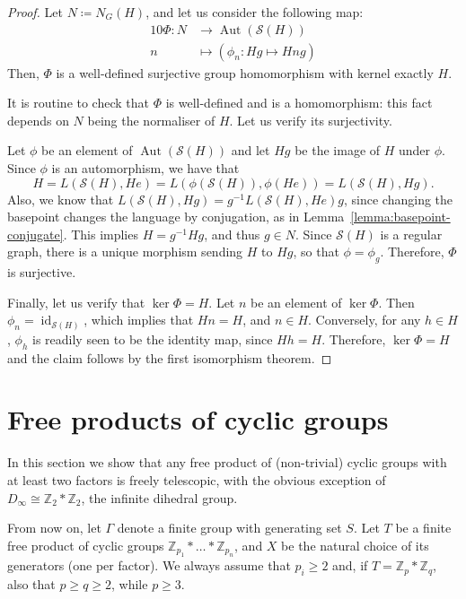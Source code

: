 \documentclass[ALCO,ThmDefs,Unicode,epreuves]{cedram}
\newcommand{\ZZ}{\mathbb{Z}}
\newcommand{\cS}{\mathcal{S}}
\DeclareMathOperator{\aut}{Aut}
\DeclareMathOperator{\id}{id}
\begin{document}
\begin{proof}
Let $N \coloneqq N_G(H)$, and let us consider the following map:
\begin{alignat*}{10}
\Phi : N &\longrightarrow \aut(\cS(H))\\
n &\longmapsto \left( \phi_n : Hg \mapsto Hng \right)
\end{alignat*}
Then, $\Phi$ is a well-defined surjective group homomorphism with kernel exactly $H$. 

It is routine to check that $\Phi$ is well-defined and is a homomorphism: this fact depends on $N$ being the normaliser of $H$. Let us verify its surjectivity. 

Let $\phi$ be an element of $\aut(\cS(H))$ and let $Hg$ be the image of $H$ under $\phi$.
Since ${\phi}$ is an automorphism, we have that
\[
 H = L(\cS(H),He) = L({\phi}(\cS(H)),{\phi}(He)) = L(\cS(H),Hg).
\]
Also, we know that $L(\cS(H),Hg) = g^{-1}L(\cS(H),He)g$, since changing the basepoint changes the language by conjugation, as in Lemma~\ref{lemma:basepoint-conjugate}. This implies $H = g^{-1}Hg$, and thus $g\in N$. Since $\cS(H)$ is a regular graph, there is a unique morphism sending $H$ to $Hg$, so that $\phi=\phi_g$. Therefore, $\Phi$ is surjective.

Finally, let us verify that $\ker {\Phi} = H$. Let $n$ be an element of $\ker \Phi$. Then $\phi_n = \id _{\cS(H)}$, which implies that $Hn = H$, and $n\in H$.
Conversely, for any $h \in H$, ${\phi}_h$ is readily seen to be the identity map, since $Hh = H$. Therefore, $\ker {\Phi} = H$ and the claim follows by the first isomorphism theorem.
\end{proof}

\section{Free products of cyclic groups}

In this section we show that any free product of (non-trivial) cyclic groups with at least two factors is freely telescopic, with the obvious exception of $D_\infty \cong \ZZ_2*\ZZ_2$, the infinite dihedral group.

From now on, let ${\Gamma}$ denote a finite group with generating set $S$. Let $T$ be a finite free product of cyclic groups $\ZZ_{p_1}*\dots*\ZZ_{p_n}$, and $X$ be the natural choice of its generators (one per factor). We always assume that $p_i \geq 2$ and, if $T=\ZZ_p*\ZZ_q$, also that $p \geq q \geq 2$, while $p \geq 3$. 
\end{document}
